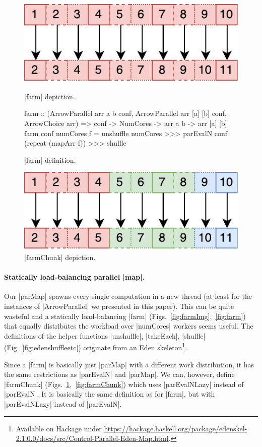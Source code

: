 \begin{figure}[thb]
\includegraphics[scale=0.7]{images/farm}
\caption{|farm| depiction.}
\label{fig:farmImg}

\begin{code}
farm :: (ArrowParallel arr a b conf,
	ArrowParallel arr [a] [b] conf, ArrowChoice arr) =>
	conf -> NumCores -> arr a b -> arr [a] [b]
farm conf numCores f =
	unshuffle numCores >>>
	parEvalN conf (repeat (mapArr f)) >>>
	shuffle
\end{code}
\caption{|farm| definition.}
\label{fig:farm}

\includegraphics[scale=0.7]{images/farmChunk}
\caption{|farmChunk| depiction.}
\label{fig:farmChunkImg}
\end{figure}

\paragraph{Statically load-balancing parallel |map|.}
Our |parMap| spawns every single computation in a new thread (at least for the instances of |ArrowParallel| we presented in this paper). This can be quite wasteful and a statically load-balancing |farm| (Figs.~\ref{fig:farmImg},~\ref{fig:farm}) that equally distributes the workload over |numCores| workers seems useful.
The definitions of the helper functions |unshuffle|, |takeEach|, |shuffle| (Fig.~\ref{fig:edenshuffleetc}) originate from an Eden skeleton\footnote{Available on Hackage under \url{https://hackage.haskell.org/package/edenskel-2.1.0.0/docs/src/Control-Parallel-Eden-Map.html}.}.

Since a |farm|  is basically just |parMap| with a different work distribution, it has the same restrictions as |parEvalN| and |parMap|. We can, however, define |farmChunk| (Figs.~\ref{fig:farmChunkImg},~\ref{fig:farmChunk}) which uses |parEvalNLazy| instead of |parEvalN|. It is basically the same definition as for |farm|, but with |parEvalNLazy| instead of |parEvalN|.

